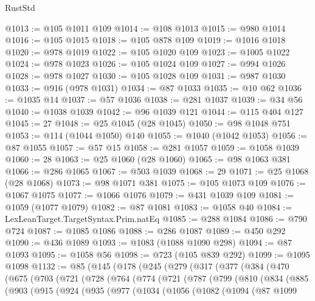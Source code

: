 \begin{lexlean}{RustStd}
\begin{coremodule}
{\begin{coremodule}
{{{{{{{{{{{{{{{{{{{{{{{{{{{{{{{{{{@1013 := @105 @1011 @109
@1014 := @108 @1013
@1015 := @980 @1014
@1016 := @105 @1015
@1018 := @105 @878 @109
@1019 := @1016 @1018
@1020 := @978 @1019
@1022 := @105 @1020 @109
@1023 := @1005 @1022
@1024 := @978 @1023
@1026 := @105 @1024 @109
@1027 := @994 @1026
@1028 := @978 @1027
@1030 := @105 @1028 @109
@1031 := @987 @1030
@1033 := @916 (@978 @1031)
@1034 := @87 @1033
@1035 := @10 @62
@1036 := @1035 @14
@1037 := @57 @1036
@1038 := @281 @1037
@1039 := @34 @56
@1040 := @1038 @1039
@1042 := @96 @1039 @121
@1044 := @115 @404 @127
@1045 := 27
@1048 := @25 @1045 (@28 @1045)
@1050 := @98 @1048 @751
@1053 := @114 (@1044 @1050) @140
@1055 := @1040 (@1042 @1053)
@1056 := @87 @1055
@1057 := @57 @15
@1058 := @281 @1057
@1059 := @1058 @1039
@1060 := 28
@1063 := @25 @1060 (@28 @1060)
@1065 := @98 @1063 @381
@1066 := @286 @1065
@1067 := @503 @1039
@1068 := 29
@1071 := @25 @1068 (@28 @1068)
@1073 := @98 @1071 @381
@1075 := @105 @1073 @109
@1076 := @1067 @1075
@1077 := @1066 @1076
@1079 := @431 @1039 @109
@1081 := @1059 (@1077 @1079)
@1082 := @87 @1081
@1083 := @1058 @40
@1084 := LexLeanTarget.TargetSyntax.Prim.natEq
@1085 := @288 @1084
@1086 := @790 @724
@1087 := @1085 @1086
@1088 := @286 @1087
@1089 := @450 @292
@1090 := @436 @1089
@1093 := @1083 (@1088 @1090 @298)
@1094 := @87 @1093
@1095 := @1058 @56
@1098 := @723 (@105 @839 @292)
@1099 := @1095 @1098
@1132 := @85
    (@145
      (@178
        (@245
          (@279
            (@317
              (@377
                (@384
                  (@470
                    (@675
                      (@703
                        (@721
                          (@728
                            (@764
                              (@774
                                (@721
                                  (@787
                                    (@799
                                      (@810
                                        (@834
                                          (@885
                                            (@903
                                              (@915
                                                (@924
                                                  (@935
                                                    (@977
                                                      (@1034
                                                        (@1056
                                                          (@1082
                                                            (@1094
                                                              (@87
                                                                @1099
}}}}}}}}}}}}}}}}}}}}}}}}}}}}}}}}}}
\end{coremodule}}
\end{coremodule}
\end{lexlean}
